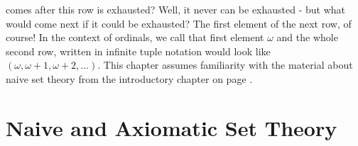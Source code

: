 comes after this row is exhausted? Well, it never can be exhausted - but what would come next if it could be exhausted? The first element of the next row, of course! In the context of ordinals, we call that first element $\omega$ and the whole second row, written in infinite tuple notation would look like $(\omega, \omega+1, \omega+2, \ldots)$. This chapter assumes familiarity with the material about naive set theory from the introductory chapter on page \pageref{Sec:NaiveSetTheory}.




% 


%
%

\section{Naive and Axiomatic Set Theory}

